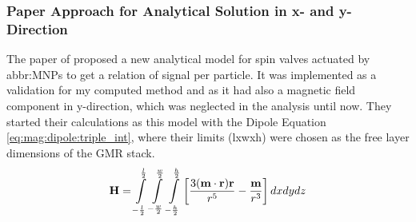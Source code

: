 \subsubsection{Paper Approach for Analytical Solution in x- and y-Direction}
The paper of \citet{lit:sim:wang} proposed a new analytical model for spin valves actuated by \glspl{abbr:MNP} to get a relation of signal per particle. It was implemented as a validation for my computed method and as it had also a magnetic field component in y-direction, which was neglected in the analysis until now. They started their calculations as this model with the Dipole Equation \ref{eq:mag:dipole:triple_int}, where their limits (lxwxh) were chosen as the free layer dimensions of the GMR stack. 
\begin{equation}
\mathbf{H} = \int\displaylimits_{-\frac{l}{2}}^{\frac{l}{2}} \int\displaylimits_{-\frac{w}{2}}^{\frac{w}{2}}\int\displaylimits_{-\frac{h}{2}}^{\frac{h}{2}}\left[{3({ \mathbf{m}}\cdot{\mathbf{r}}){\mathbf{r}}\over r^{5}}-{{\mathbf{m}}\over r^{3}}\right]dxdydz
\label{eq:mag:dipole:triple_int}
\end{equation}

